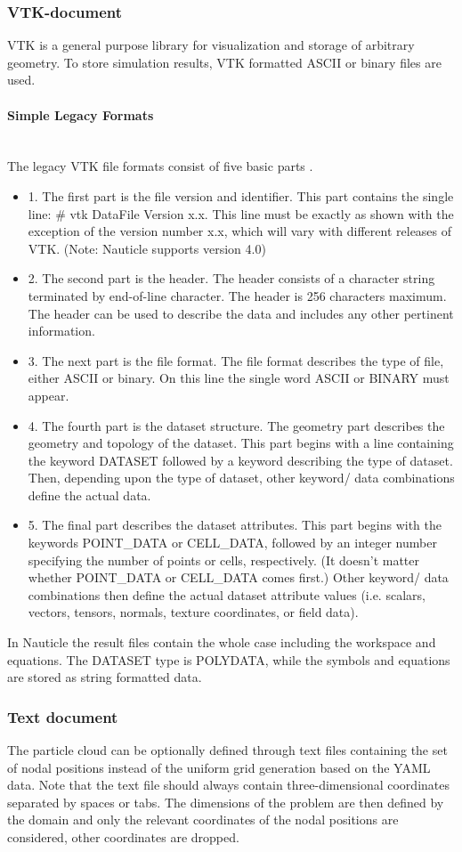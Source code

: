 \documentclass[a4paper,12pt,openany]{book}
\newcommand{\myparagraph}[1]{\paragraph{#1}\mbox{}\\\noindent}
\theoremstyle{break}
\begin{document}
\subsubsection{VTK-document}
VTK is a general purpose library for visualization and storage of arbitrary geometry. To store simulation results, VTK formatted ASCII or binary files are used.
\myparagraph{Simple Legacy Formats}
The legacy VTK file formats consist of five basic parts \cite{VTK_format}.
\begin{itemize}
\item 1. The first part is the file version and identifier. This part contains the single line: \# vtk DataFile Version x.x. This line must be exactly as shown with the exception of the version number x.x, which will vary with different releases of VTK. (Note: Nauticle supports version 4.0) 
\item 2. The second part is the header. The header consists of a character string terminated by end-of-line character. The header is 256 characters maximum. The header can be used to describe the data and includes any other pertinent information. 
\item 3. The next part is the file format. The file format describes the type of file, either ASCII or binary. On this line the single word ASCII or BINARY must appear. 
\item 4. The fourth part is the dataset structure. The geometry part describes the geometry and topology of the dataset. This part begins with a line containing the keyword DATASET followed by a keyword describing the type of dataset. Then, depending upon the type of dataset, other keyword/ data combinations define the actual data.
\item 5. The final part describes the dataset attributes. This part begins with the keywords POINT\_DATA or CELL\_DATA, followed by an integer number specifying the number of points or cells, respectively. (It doesn't matter whether POINT\_DATA or CELL\_DATA comes first.) Other keyword/ data combinations then define the actual dataset attribute values (i.e. scalars, vectors, tensors, normals, texture coordinates, or field data). 
\end{itemize}
In Nauticle the result files contain the whole case including the workspace and equations. The DATASET type is POLYDATA, while the symbols and equations are stored as string formatted data.
\subsubsection{Text document}
The particle cloud can be optionally defined through text files containing the set of nodal positions instead of the uniform grid generation based on the YAML data. Note that the text file should always contain three-dimensional coordinates separated by spaces or tabs. The dimensions of the problem are then defined by the domain and only the relevant coordinates of the nodal positions are considered, other coordinates are dropped.
\end{document}

